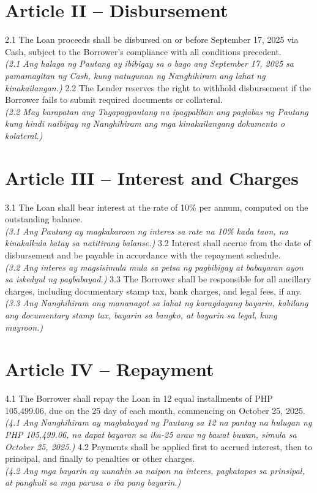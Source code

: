 \documentclass[a4paper,12pt]{article}
\begin{document}
\section*{Article II – Disbursement}
2.1 The Loan proceeds shall be disbursed on or before September 17, 2025 via Cash, subject to the Borrower’s compliance with all conditions precedent. \\
\textit{(2.1 Ang halaga ng Pautang ay ibibigay sa o bago ang September 17, 2025 sa pamamagitan ng Cash, kung natugunan ng Nanghihiram ang lahat ng kinakailangan.)}
2.2 The Lender reserves the right to withhold disbursement if the Borrower fails to submit required documents or collateral. \\
\textit{(2.2 May karapatan ang Tagapagpautang na ipagpaliban ang paglabas ng Pautang kung hindi naibigay ng Nanghihiram ang mga kinakailangang dokumento o kolateral.)}
\section*{Article III – Interest and Charges}
3.1 The Loan shall bear interest at the rate of 10\% per annum, computed on the outstanding balance. \\
\textit{(3.1 Ang Pautang ay magkakaroon ng interes sa rate na 10\% kada taon, na kinakalkula batay sa natitirang balanse.)}
3.2 Interest shall accrue from the date of disbursement and be payable in accordance with the repayment schedule. \\
\textit{(3.2 Ang interes ay magsisimula mula sa petsa ng pagbibigay at babayaran ayon sa iskedyul ng pagbabayad.)}
3.3 The Borrower shall be responsible for all ancillary charges, including documentary stamp tax, bank charges, and legal fees, if any. \\
\textit{(3.3 Ang Nanghihiram ang mananagot sa lahat ng karagdagang bayarin, kabilang ang documentary stamp tax, bayarin sa bangko, at bayarin sa legal, kung mayroon.)}
\section*{Article IV – Repayment}
4.1 The Borrower shall repay the Loan in 12 equal installments of PHP 105,499.06, due on the 25 day of each month, commencing on October 25, 2025. \\
\textit{(4.1 Ang Nanghihiram ay magbabayad ng Pautang sa 12 na pantay na hulugan ng PHP 105,499.06, na dapat bayaran sa ika-25 araw ng bawat buwan, simula sa October 25, 2025.)}
4.2 Payments shall be applied first to accrued interest, then to principal, and finally to penalties or other charges. \\
\textit{(4.2 Ang mga bayarin ay uunahin sa naipon na interes, pagkatapos sa prinsipal, at panghuli sa mga parusa o iba pang bayarin.)}
\end{document}

